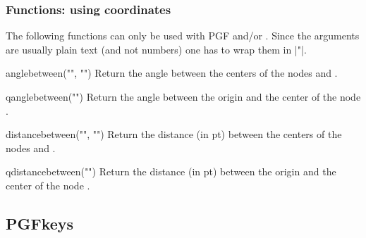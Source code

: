 \begin{multicols}{2}
\subsubsection{Functions: using coordinates}
The following functions can only be used with PGF and/or \tikzname.
Since the arguments are usually plain text (and not numbers) one has to wrap
them in |"|.
\begin{math-function}{anglebetween("", "")}\mathcommand
  Return the angle between the centers of the nodes  and .
\end{math-function}
\begin{math-function}{qanglebetween("")}\mathcommand
  Return the angle between the origin and the center of the node .
\end{math-function}
\begin{math-function}{distancebetween("", "")}\mathcommand
  Return the distance (in pt) between the centers of the nodes  and .
\end{math-function}
\begin{math-function}{qdistancebetween("")}\mathcommand
  Return the distance (in pt) between the origin and the center of the node .
\end{math-function}

\end{multicols}

\begin{codeexample}[width=6cm,preamble=\usetikzlibrary{calc,misc,through}]
\end{codeexample}
\subsection{PGFkeys}

